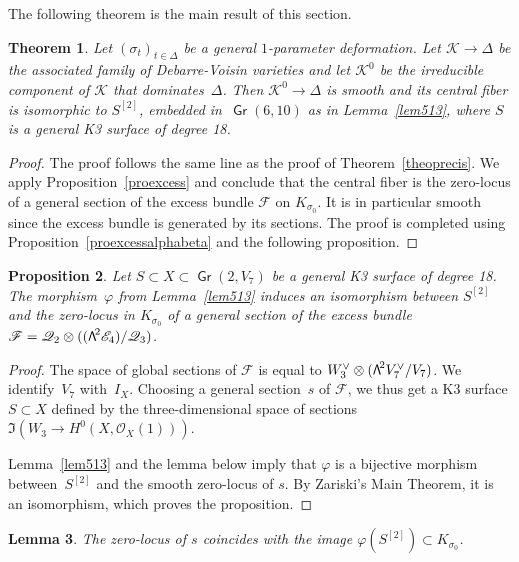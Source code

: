\documentclass[11pt]{article}
\let\mathcal\mathscr
\newtheorem{lemm}{Lemma}[section]
\newtheorem{theo}[lemm]{Theorem}
\newtheorem{prop}[lemm]{Proposition}
\theoremstyle{definition}
\newcommand\cE{\mathcal{E}}
\newcommand\cF{\mathcal{F}}
\newcommand\cK{\mathcal{K}}
\newcommand\cO{\mathcal{O}}\let\OO\cO
\newcommand\cQ{\mathcal{Q}}\let\quotauto\cQ
\DeclareMathOperator{\Gr}{\mathsf{Gr}}
\let\phi\varphi
\newcommand\bw[1]{{\hbox{\large$\mathsf{\Lambda}$}^{\!#1}}}
\newcommand\hilbS{S^{[2]}}
\begin{document}
The following theorem is the main result of this section.

\begin{theo}\label{theogenre10}
Let $(\sigma_t)_{t\in \Delta}$ be a general $1$-parameter deformation.
Let $\cK\to\Delta$ be the associated family of Debarre-Voisin varieties and let $\cK^0$ be the irreducible component of $\cK$ that dominates~$\Delta$.
Then $\cK^0\to \Delta$
is smooth and its central fiber is isomorphic to $\hilbS$, embedded in~$\Gr(6,10)$ as in Lemma~\ref{lem513}, where
$S$ is a general K3 surface of degree 18.
\end{theo}

\begin{proof} The proof follows the same line as the proof of Theorem~\ref{theoprecis}. We apply Proposition~\ref{proexcess} and conclude that
the central fiber is the zero-locus of a general section of the excess bundle
$\cF$
on $K_{\sigma_0}$.
It is in particular smooth since the excess bundle is generated by its sections.
The proof is completed using Proposition~\ref{proexcessalphabeta} and the following proposition.\end{proof}

\begin{prop} \label{propidentexcessgenre10}
Let $S\subset X\subset \Gr(2,V_7)$ be a general K3 surface of degree 18. The morphism~$\phi$ from Lemma~\ref{lem513} induces an isomorphism between
$ \hilbS $ and the zero-locus in $K_{\sigma_0}$ of a general section of
the excess bundle $\cF=\cQ_2\otimes((\bw2\cE_4)/\cQ_3)$.
\end{prop}

\begin{proof} The space of global sections of $\cF$ is equal to $W_3^\vee\otimes (\bw2V_7^\vee/V_7)$. We identify~$V_7$ with~$I_X$. Choosing a general section~$s$ of $\cF$, we thus get a K3 surface $S\subset X$ defined by the three-dimensional space of sections
$\Im (W_3\to H^0(X,\cO_X(1)))$.

{Lemma~\ref{lem513} and the lemma below imply that $\phi$ is a bijective morphism between~$\hilbS$ and the smooth zero-locus of $s$. By Zariski's Main Theorem, it is an isomorphism, which proves the proposition.}
\end{proof}

\begin{lemm}\label{lem520}
The
zero-locus of $s$ coincides with the image $\phi(\hilbS )\subset K_{\sigma_0}$.
\end{lemm}
\end{document}
